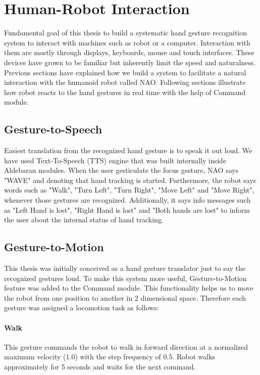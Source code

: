 \section{Human-Robot Interaction} Fundamental goal of this thesis to build a systematic hand gesture recognition system to interact with machines such as robot or a computer. Interaction with them are mostly through displays, keyboards, mouse and touch interfaces. These devices have grown to be familiar but inherently limit the speed and naturalness. Previous sections have explained how we build a system to facilitate a natural interaction with the humanoid robot called NAO. Following sections illustrate how robot reacts to the hand gestures in real time with the help of Command module.

\subsection{Gesture-to-Speech} Easiest translation from the recognized hand gesture is to speak it out loud. We have used Text-To-Speech (TTS) engine that was built internally inside Aldebaran modules. When the user gesticulate the focus gesture, NAO says "WAVE" and denoting that hand tracking is started. Furthermore, the robot says words such as "Walk", "Turn Left", "Turn Right", "Move Left" and "Move Right", whenever those gestures are recognized. Additionally, it says info messages such as "Left Hand is lost", "Right Hand is lost" and "Both hands are lost" to inform the user about the internal status of hand tracking.

\subsection{Gesture-to-Motion} This thesis was initially conceived as a hand gesture translator just to say the recognized gestures loud. To make this system more useful, Gesture-to-Motion feature was added to the Command module. This functionality helps us to move the robot from one position to another in 2 dimensional space. Therefore each gesture was assigned a locomotion task as follows:

\paragraph*{Walk} This gesture commands the robot to walk in forward direction at a normalized maximum velocity (1.0) with the step frequency of 0.5. Robot walks approximately for 5 seconds and waits for the next command.

